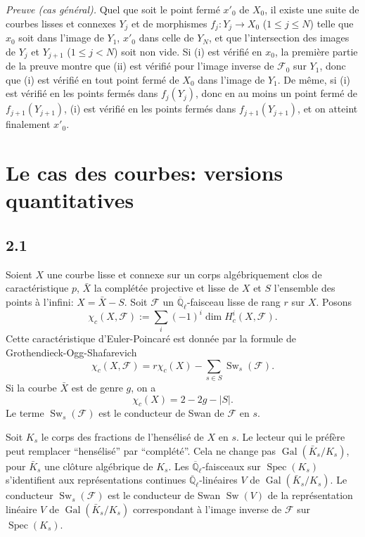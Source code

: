 \documentclass[11pt,a4paper]{article}
\theoremstyle{plain}
\theoremstyle{definition}
\DeclareMathOperator{\Spec}{Spec}
\DeclareMathOperator{\Gal}{Gal}
\DeclareMathOperator{\Sw}{Sw}
\begin{document}
\medskip
\noindent\textit{Preuve (cas g\'en\'eral).} Quel que soit le point ferm\'e $x'_0$ de $X_0$, il existe une suite de courbes lisses et connexes $Y_j$ et de morphismes $f_j: Y_j \to X_0$ ($1 \leq j \leq N$) telle que $x_0$ soit dans l'image de $Y_1$, $x'_0$ dans celle de $Y_N$, et que l'intersection des images de $Y_j$ et $Y_{j+1}$ ($1 \leq j < N$) soit non vide. Si (i) est v\'erifi\'e en $x_0$, la premi\`ere partie de la preuve montre que (ii) est v\'erifi\'e pour l'image inverse de $\mathcal{F}_0$ sur $Y_1$, donc que (i) est v\'erifi\'e en tout point ferm\'e de $X_0$ dans l'image de $Y_1$. De m\^eme, si (i) est v\'erifi\'e en les points ferm\'es dans $f_j(Y_j)$, donc en au moins un point ferm\'e de $f_{j+1}(Y_{j+1})$, (i) est v\'erifi\'e en les points ferm\'es dans $f_{j+1}(Y_{j+1})$, et on atteint finalement $x'_0$.


\section{Le cas des courbes: versions quantitatives}

\subsection{2.1}

Soient $X$ une courbe lisse et connexe sur un corps alg\'ebriquement clos de caract\'eristique $p$, $\bar{X}$ la compl\'et\'ee projective et lisse de $X$ et $S$ l'ensemble des points \`a l'infini: $X = \bar{X} - S$. Soit $\mathcal{F}$ un $\overline{\mathbb{Q}}_\ell$-faisceau lisse de rang $r$ sur $X$. Posons
\[
\chi_c(X, \mathcal{F}) := \sum_i (-1)^i \dim H_c^i(X, \mathcal{F}).
\]
Cette caract\'eristique d'Euler-Poincar\'e est donn\'ee par la formule de Grothendieck-Ogg-Shafarevich
\begin{equation}\label{eq:2.1.1}
\chi_c(X, \mathcal{F}) = r\chi_c(X) - \sum_{s \in S} \Sw_s(\mathcal{F}).
\end{equation}
Si la courbe $\bar{X}$ est de genre $g$, on a
\begin{equation}\label{eq:2.1.2}
\chi_c(X) = 2 - 2g - |S|.
\end{equation}
Le terme $\Sw_s(\mathcal{F})$ est le conducteur de Swan de $\mathcal{F}$ en $s$.

Soit $K_s$ le corps des fractions de l'hens\'elis\'e de $X$ en $s$. Le lecteur qui le pr\'ef\`ere peut remplacer ``hens\'elis\'e'' par ``compl\'et\'e''. Cela ne change pas $\Gal(\bar{K}_s/K_s)$, pour $\bar{K}_s$ une cl\^oture alg\'ebrique de $K_s$. Les $\overline{\mathbb{Q}}_\ell$-faisceaux sur $\Spec(K_s)$ s'identifient aux repr\'esentations continues $\overline{\mathbb{Q}}_\ell$-lin\'eaires $V$ de $\Gal(\bar{K}_s/K_s)$. Le conducteur $\Sw_s(\mathcal{F})$ est le conducteur de Swan $\Sw(V)$ de la repr\'esentation lin\'eaire $V$ de $\Gal(\bar{K}_s/K_s)$ correspondant \`a l'image inverse de $\mathcal{F}$ sur $\Spec(K_s)$.
\end{document}

